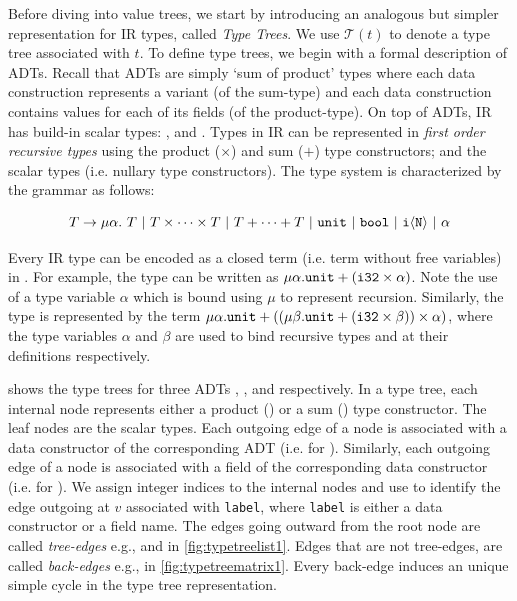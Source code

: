 Before diving into value trees, we start by introducing an analogous but simpler representation for IR types, called {\em Type Trees}.
We use $\mathcal{T}(t)$ to denote a type tree associated with $t$.
To define type trees, we begin with a formal description of ADTs.
Recall that ADTs are simply `sum of product' types where each data construction represents a variant (of the sum-type) and
each data construction contains values for each of its fields (of the product-type).
On top of ADTs, IR has build-in scalar types: ,  and .
Types in IR can be represented in {\em first order recursive types} using the product ($\times$) and sum ($+$) type
constructors; and the scalar types (i.e. nullary type constructors).
The type system is characterized by the grammar \typegrammar{} as follows:

$$
T \rightarrow \mu \alpha. \ T \ |\ T \times \dots \times T \ |\  T + \dots + T \ |\  \type{unit} \ |\ \type{bool} \ |\  \type{i\langle N \rangle} \ |\ \alpha
$$

Every IR type can be encoded as a closed term (i.e. term without free variables) in \typegrammar{}.
For example, the  type can be written as $\mu \alpha. {\tt unit} + ({\tt i32} \times \alpha)$.
Note the use of a type variable $\alpha$ which is bound using $\mu$ to represent recursion.
Similarly, the  type is represented by the term
$\mu \alpha. {\tt unit} + ((\mu \beta. {\tt unit} + ({\tt i32} \times \beta)) \times \alpha)$,
where the type variables $\alpha$ and $\beta$ are used to bind recursive types  and 
at their definitions respectively.



 shows the type trees for three ADTs , , and  respectively.
In a type tree, each internal node represents either a product (\prodn{}) or a sum (\sumn{}) type constructor.
The leaf nodes are the scalar types.
Each outgoing edge of a \sumn{} node is associated with a data constructor of the corresponding ADT (i.e.  for ).
Similarly, each outgoing edge of a \prodn{} node is associated with a field of the corresponding data constructor (i.e.  for ).
We assign integer indices to the internal nodes and use  to identify the edge outgoing at $v$ associated with {\tt label},
where {\tt label} is either a data constructor or a field name.
The edges going outward from the root node are called {\em tree-edges} e.g.,  and  in \cref{fig:typetreelist1}.
Edges that are not tree-edges, are called {\em back-edges} e.g.,  in \cref{fig:typetreematrix1}.
Every back-edge induces an unique simple cycle in the type tree representation.

